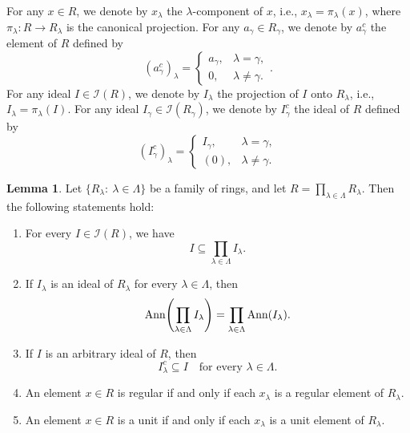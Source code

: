 \documentclass{amsart}
\theoremstyle{definition}
\theoremstyle{remark}
\numberwithin{equation}{section}
\newcommand{\Ann}{{\rm Ann}}
\theoremstyle{definition}\newtheorem{thm}{Theorem}[section]
\theoremstyle{definition}\newtheorem{cor}[thm]{Corollary}
\theoremstyle{definition}\newtheorem{lem}[thm]{Lemma}
\theoremstyle{definition}\newtheorem{prop}[thm]{Proposition}
\theoremstyle{definition}\newtheorem{defn}[thm]{Definition}
\theoremstyle{definition}\newtheorem{Rem}[thm]{Remark}
\theoremstyle{remark}\newtheorem{rem}[thm]{Remark}
\theoremstyle{definition}\newtheorem{exam}[thm]{Example}
\theoremstyle{definition}\newtheorem{qu}[thm]{question}
\begin{document}
For any $x \in R$, we denote by $x_\lambda$ the $\lambda$-component of $x$, i.e., $x_\lambda = \pi_\lambda(x)$, where $\pi_\lambda : R \to R_\lambda$ is the canonical projection.  
For any $a_\gamma \in R_\gamma$, we denote by $a_\gamma^{c}$ the element of $R$ defined by  
\[
(a_\gamma^{c})_\lambda =
\begin{cases}
a_\gamma, & \lambda = \gamma, \\
0, & \lambda \neq \gamma .
\end{cases}.\]
For any ideal $I \in \mathcal{I}(R)$, we denote by $I_\lambda$ the projection of $I$ onto $R_\lambda$, i.e., $I_\lambda = \pi_\lambda(I)$.  
For any ideal $I_\gamma \in \mathcal{I}(R_\gamma)$, we denote by $I_\gamma^{c}$ the ideal of $R$ defined by  
\[
(I_\gamma^{c})_\lambda =
\begin{cases}
I_\gamma, & \lambda = \gamma, \\
(0), & \lambda \neq \gamma .
\end{cases}
\]
\begin{lem}\label{42}
Let $\{R_\lambda:~\lambda \in \Lambda\}$ be a family of rings, and let $R=\prod_{\lambda\in\Lambda}R_\lambda$. Then the following statements hold:

\begin{enumerate}
    \item For every $I\in\mathcal{I}(R)$, we have 
    \[
    I \subseteq \prod_{\lambda\in\Lambda} I_\lambda.
    \]
    
    \item If $I_\lambda$ is an ideal of $R_\lambda$ for every $\lambda\in\Lambda$, then 
    \[
    \Ann\!\left(\prod_{\lambda\in\Lambda} I_\lambda\right)
    = \prod_{\lambda\in\Lambda}\Ann(I_\lambda).
    \]
    
    \item If $I$ is an arbitrary ideal of $R$, then 
    \[
    I_\lambda^{c} \subseteq I \quad \text{for every } \lambda \in \Lambda.
    \]
    
    \item An element $x\in R$ is regular if and only if each $x_\lambda$ is a regular element of $R_\lambda$.
    
    \item An element $x\in R$ is a unit if and only if each $x_\lambda$ is a unit element of $R_\lambda$.
\end{enumerate}
\end{lem}
\end{document}
